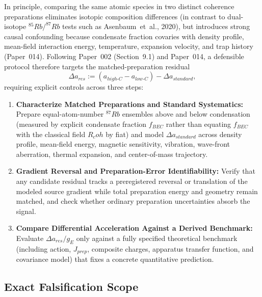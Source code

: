 \documentclass[american,11pt,letterpaper]{article}
\newcommand{\Rcoh}{R_{\mathrm{coh}}}
\def\mathrm#1{#1}%
\def\emph#1{#1}%
\def\Rcoh{R_coh}%
\begin{document}
In principle, comparing the same atomic species in two distinct coherence preparations eliminates isotopic composition differences (in contrast to dual-isotope $^{85}\mathrm{Rb}/^{87}\mathrm{Rb}$ tests such as Asenbaum~\emph{et~al.}, 2020), but introduces strong causal confounding because condensate fraction covaries with density profile, mean-field interaction energy, temperature, expansion velocity, and trap history (Paper~014). Following Paper~002 (Section~9.1) and Paper~014, a defensible protocol therefore targets the matched-preparation residual
\begin{equation}
\Delta a_{\mathrm{res}} := (a_{\mathrm{high\text{-}C}} - a_{\mathrm{low\text{-}C}}) - \Delta a_{\mathrm{standard}},
\label{eq:bec_matched_residual}
\end{equation}
requiring explicit controls across three steps:
\begin{enumerate}
    \item \textbf{Characterize Matched Preparations and Standard Systematics:} Prepare equal-atom-number $^{87}\mathrm{Rb}$ ensembles above and below condensation (measured by explicit condensate fraction $f_{\mathrm{BEC}}$ rather than equating $f_{\mathrm{BEC}}$ with the classical field $\Rcoh$ by fiat) and model $\Delta a_{\mathrm{standard}}$ across density profile, mean-field energy, magnetic sensitivity, vibration, wave-front aberration, thermal expansion, and center-of-mass trajectory.
    \item \textbf{Gradient Reversal and Preparation-Error Identifiability:} Verify that any candidate residual tracks a preregistered reversal or translation of the modeled source gradient while total preparation energy and geometry remain matched, and check whether ordinary preparation uncertainties absorb the signal.
    \item \textbf{Compare Differential Acceleration Against a Derived Benchmark:} Evaluate $\Delta a_{\mathrm{res}}/g_E$ only against a fully specified theoretical benchmark (including action, $J_{\mathrm{prep}}$, composite charges, apparatus transfer function, and covariance model) that fixes a concrete quantitative prediction.
\end{enumerate}

\subsection{Exact Falsification Scope}
\end{document}
